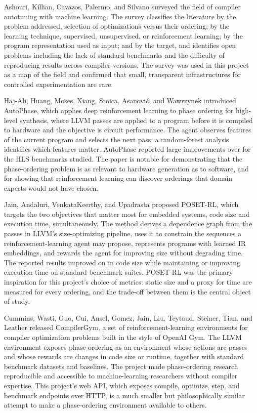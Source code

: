 Ashouri, Killian, Cavazos, Palermo, and Silvano \cite{ashouri2018} surveyed the field of compiler autotuning with machine learning. The survey classifies the literature by the problem addressed, selection of optimizations versus their ordering; by the learning technique, supervised, unsupervised, or reinforcement learning; by the program representation used as input; and by the target, and identifies open problems including the lack of standard benchmarks and the difficulty of reproducing results across compiler versions. The survey was used in this project as a map of the field and confirmed that small, transparent infrastructures for controlled experimentation are rare.

Haj-Ali, Huang, Moses, Xiang, Stoica, Asanovi\'{c}, and Wawrzynek \cite{hajali2020} introduced AutoPhase, which applies deep reinforcement learning to phase ordering for high-level synthesis, where LLVM passes are applied to a program before it is compiled to hardware and the objective is circuit performance. The agent observes features of the current program and selects the next pass; a random-forest analysis identifies which features matter. AutoPhase reported large improvements over  for the HLS benchmarks studied. The paper is notable for demonstrating that the phase-ordering problem is as relevant to hardware generation as to software, and for showing that reinforcement learning can discover orderings that domain experts would not have chosen.

Jain, Andaluri, VenkataKeerthy, and Upadrasta \cite{jain2022} proposed POSET-RL, which targets the two objectives that matter most for embedded systems, code size and execution time, simultaneously. The method derives a dependence graph from the passes in LLVM's  size-optimizing pipeline, uses it to constrain the sequences a reinforcement-learning agent may propose, represents programs with learned IR embeddings, and rewards the agent for improving size without degrading time. The reported results improved on  in code size while maintaining or improving execution time on standard benchmark suites. POSET-RL was the primary inspiration for this project's choice of metrics: static size and a proxy for time are measured for every ordering, and the trade-off between them is the central object of study.

Cummins, Wasti, Guo, Cui, Ansel, Gomez, Jain, Liu, Teytaud, Steiner, Tian, and Leather \cite{cummins2022} released CompilerGym, a set of reinforcement-learning environments for compiler optimization problems built in the style of OpenAI Gym. The LLVM environment exposes phase ordering as an environment whose actions are passes and whose rewards are changes in code size or runtime, together with standard benchmark datasets and baselines. The project made phase-ordering research reproducible and accessible to machine-learning researchers without compiler expertise. This project's web API, which exposes compile, optimize, step, and benchmark endpoints over HTTP, is a much smaller but philosophically similar attempt to make a phase-ordering environment available to others.

